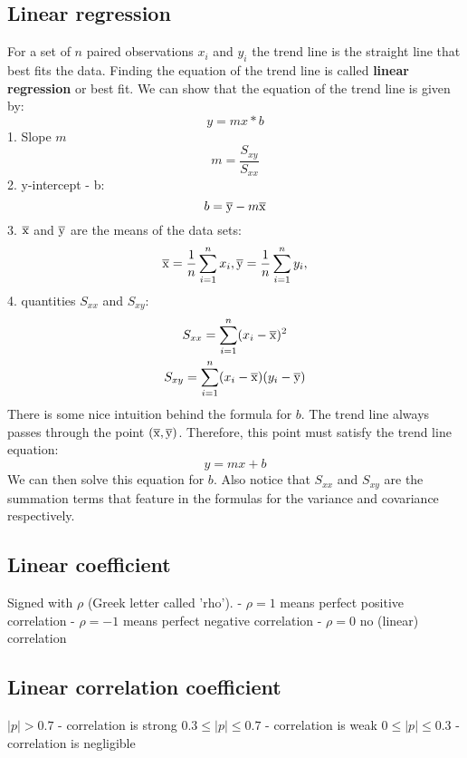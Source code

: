 \documentclass{article}
\begin{document}
\subsection{Linear regression}
For a set of $n$ paired observations $x_i$ and $y_i$ the trend line is the
straight line that best fits the data.
Finding the equation of the trend line is called \textbf{linear regression}
or best fit.
We can show that the equation of the trend line is given by:
\begin{equation}
  y = mx * b
\end{equation}
1. Slope $m$
\begin{equation}
  m = \frac{S_{xy}}{S_{xx}}
\end{equation}
2. y-intercept - b:
\begin{equation}
  b = \overline{\rm y} - m\overline{\rm x}
\end{equation}
3. $\overline{\rm x}$ and $\overline{\rm y}$ are the means of the data sets:
\begin{equation}
  \overline{\rm x} = \frac{1}{n} \sum_{i=1}^nx_i, \overline{\rm y} = \frac{1}{n} \sum_{i=1}^ny_i,
\end{equation}
4. quantities $S_{xx}$ and $S_{xy}$:
\begin{equation}
  \begin{gathered}
    S_{xx} = \sum_{i=1}^n (x_i - \overline{\rm x})^2 \\
    S_{xy} = \sum_{i=1}^n(x_i - \overline{\rm x})(y_i - \overline{\rm y})
  \end{gathered}
\end{equation}
There is some nice intuition behind the formula for $b$. The trend line
always passes through the point $(\overline{\rm x}, \overline{\rm y})$.
Therefore, this point must satisfy the trend line equation:
\begin{equation}
  y = mx + b
\end{equation}
We can then solve this equation for $b$. Also notice that $S_{xx}$ and $S_{xy}$
are the summation terms that feature in the formulas for the variance and
covariance respectively.
\subsection{Linear coefficient}
Signed with $\rho$ (Greek letter called 'rho').
- $\rho = 1$ means perfect positive correlation
- $\rho = -1$ means perfect negative correlation
- $\rho = 0$ no (linear) correlation
\subsection{Linear correlation coefficient}
$|p| > 0.7$ - correlation is strong
$0.3 \leqslant |p| \leqslant 0.7$ - correlation is weak
$0 \leqslant |p| \leqslant 0.3$ - correlation is negligible
\end{document}
